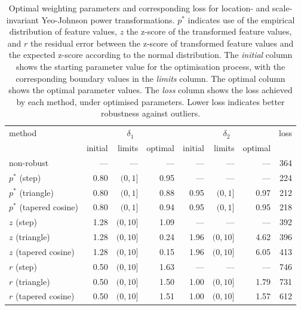 \documentclass[
  a4paper,
]{article}
\begin{document}
\begin{table}
\begin{center}
\caption{Optimal weighting parameters and corresponding loss for location- and scale-invariant Yeo-Johnson power transformations. $p^{*}$ indicates use of the empirical distribution of feature values, $z$ the z-score of the transformed feature values, and $r$ the residual error between the z-score of transformed feature values and the expected z-score according to the normal distribution. The \textit{initial} column shows the starting parameter value for the optimisation process, with the corresponding boundary values in the \textit{limits} column. The {optimal} column shows the optimal parameter values. The \textit{loss} column shows the loss achieved by each method, under optimised parameters. Lower loss indicates better robustness against outliers.}
\label{tab:optimal-weighting-parameters-yeo-johnson}
\begin{tabular}{l r r r r r r r}

\toprule
method & \multicolumn{3}{c}{$\delta_1$} & \multicolumn{3}{c}{$\delta_2$} & loss \\
& initial & limits & optimal & initial & limits & optimal & \\

\midrule
non-robust               & ---  & ---       & ---  & ---  & ---       & ---  & 364 \\
$p^{*}$ (step)           & 0.80 & $(0, 1]$  & 0.95 & ---  & ---       & ---  & 224 \\
$p^{*}$ (triangle)       & 0.80 & $(0, 1]$  & 0.88 & 0.95 & $(0, 1]$  & 0.97 & 212 \\
$p^{*}$ (tapered cosine) & 0.80 & $(0, 1]$  & 0.94 & 0.95 & $(0, 1]$  & 0.95 & 218 \\
$z$ (step)               & 1.28 & $(0, 10]$ & 1.09 & ---  & ---       & ---  & 392 \\
$z$ (triangle)           & 1.28 & $(0, 10]$ & 0.24 & 1.96 & $(0, 10]$ & 4.62 & 396 \\
$z$ (tapered cosine)     & 1.28 & $(0, 10]$ & 0.15 & 1.96 & $(0, 10]$ & 6.05 & 413 \\
$r$ (step)               & 0.50 & $(0, 10]$ & 1.63 & ---  & ---       & ---  & 746 \\
$r$ (triangle)           & 0.50 & $(0, 10]$ & 1.50 & 1.00 & $(0, 10]$ & 1.79 & 731 \\
$r$ (tapered cosine)     & 0.50 & $(0, 10]$ & 1.51 & 1.00 & $(0, 10]$ & 1.57 & 612 \\
\bottomrule
\end{tabular}
\end{center}
\end{table}
\end{document}
